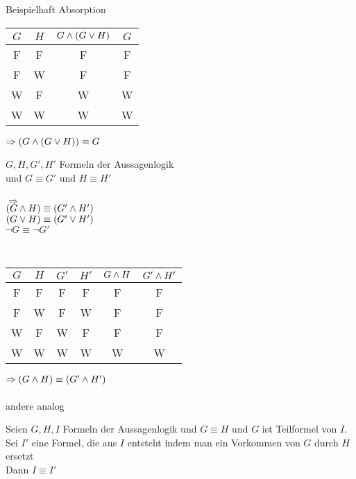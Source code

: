 \beweis{}
Beispielhaft Absorption

\begin{tabular}{c|c|c|c}
$G$ & $H$ & $G \wedge ( G \vee H)$ & $G$ \\
\hline
F & F & F & F \\
F & W & F & F \\
W & F & W & W \\
W & W & W & W 
\end{tabular}
$\Rightarrow (G \wedge ( G \vee H )) \equiv G$

$G, H, G', H'$ Formeln der Aussagenlogik\\
und $G \equiv G'$ und $H \equiv H'$\\
\noindent\\
$\Rightarrow$\\
$(G \wedge H) \equiv (G' \wedge H')$\\
$(G \vee H) \equiv (G' \vee H')$\\
$\neg G \equiv \neg G'$

\beweis{}\\
\begin{tabular}{c|c|c|c|c|c}
$G$ & $H$ & $G'$ & $H'$ & $G \wedge H$ & $G' \wedge H'$ \\
\hline
F & F & F & F & F & F \\
F & W & F & W & F & F \\
W & F & W & F & F & F \\
W & W & W & W & W & W \\
\end{tabular}
$\Rightarrow (G \wedge H ) \equiv ( G' \wedge H')$\\
\noindent\\
andere analog

Seien $G, H, I$ Formeln der Aussagenlogik und $G \equiv H$ und $G$ ist Teilformel von $I$.\\
Sei $I'$ eine Formel, die aus $I$ entsteht indem man ein Vorkommen von $G$ durch $H$ ersetzt\\
Dann $I \equiv I'$